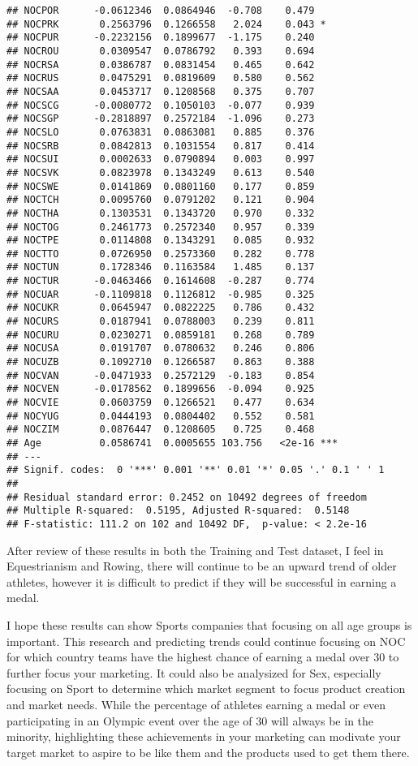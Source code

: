 \documentclass[]{article}
\begin{document}
\begin{verbatim}
## NOCPOR      -0.0612346  0.0864946  -0.708    0.479    
## NOCPRK       0.2563796  0.1266558   2.024    0.043 *  
## NOCPUR      -0.2232156  0.1899677  -1.175    0.240    
## NOCROU       0.0309547  0.0786792   0.393    0.694    
## NOCRSA       0.0386787  0.0831454   0.465    0.642    
## NOCRUS       0.0475291  0.0819609   0.580    0.562    
## NOCSAA       0.0453717  0.1208568   0.375    0.707    
## NOCSCG      -0.0080772  0.1050103  -0.077    0.939    
## NOCSGP      -0.2818897  0.2572184  -1.096    0.273    
## NOCSLO       0.0763831  0.0863081   0.885    0.376    
## NOCSRB       0.0842813  0.1031554   0.817    0.414    
## NOCSUI       0.0002633  0.0790894   0.003    0.997    
## NOCSVK       0.0823978  0.1343249   0.613    0.540    
## NOCSWE       0.0141869  0.0801160   0.177    0.859    
## NOCTCH       0.0095760  0.0791202   0.121    0.904    
## NOCTHA       0.1303531  0.1343720   0.970    0.332    
## NOCTOG       0.2461773  0.2572340   0.957    0.339    
## NOCTPE       0.0114808  0.1343291   0.085    0.932    
## NOCTTO       0.0726950  0.2573360   0.282    0.778    
## NOCTUN       0.1728346  0.1163584   1.485    0.137    
## NOCTUR      -0.0463466  0.1614608  -0.287    0.774    
## NOCUAR      -0.1109818  0.1126812  -0.985    0.325    
## NOCUKR       0.0645947  0.0822225   0.786    0.432    
## NOCURS       0.0187941  0.0788003   0.239    0.811    
## NOCURU       0.0230271  0.0859181   0.268    0.789    
## NOCUSA       0.0191707  0.0780632   0.246    0.806    
## NOCUZB       0.1092710  0.1266587   0.863    0.388    
## NOCVAN      -0.0471933  0.2572129  -0.183    0.854    
## NOCVEN      -0.0178562  0.1899656  -0.094    0.925    
## NOCVIE       0.0603759  0.1266521   0.477    0.634    
## NOCYUG       0.0444193  0.0804402   0.552    0.581    
## NOCZIM       0.0876447  0.1208605   0.725    0.468    
## Age          0.0586741  0.0005655 103.756   <2e-16 ***
## ---
## Signif. codes:  0 '***' 0.001 '**' 0.01 '*' 0.05 '.' 0.1 ' ' 1
## 
## Residual standard error: 0.2452 on 10492 degrees of freedom
## Multiple R-squared:  0.5195, Adjusted R-squared:  0.5148 
## F-statistic: 111.2 on 102 and 10492 DF,  p-value: < 2.2e-16
\end{verbatim}

After review of these results in both the Training and Test dataset, I
feel in Equestrianism and Rowing, there will continue to be an upward
trend of older athletes, however it is difficult to predict if they will
be successful in earning a medal.

I hope these results can show Sports companies that focusing on all age
groups is important. This research and predicting trends could continue
focusing on NOC for which country teams have the highest chance of
earning a medal over 30 to further focus your marketing. It could also
be analysized for Sex, especially focusing on Sport to determine which
market segment to focus product creation and market needs. While the
percentage of athletes earning a medal or even participating in an
Olympic event over the age of 30 will always be in the minority,
highlighting these achievements in your marketing can modivate your
target market to aspire to be like them and the products used to get
them there.
\end{document}
